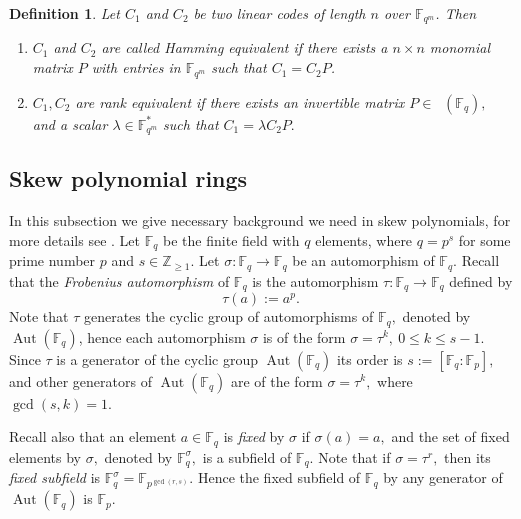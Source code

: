 \documentclass[12pt,paper]{article}
\theoremstyle{plain}
\newtheorem{definition}[theorem]{Definition}
\newcommand{\Fq}{\mathbb{F}_{q}}
\DeclareMathOperator{\aut}{Aut}
\DeclareMathOperator{\GL}{GL_{n}}
\begin{document}
\begin{definition} Let $C_1$ and $C_2$ be two linear codes of length $n$ over $\mathbb{F}_{q^m}$. Then 
\begin{enumerate}
    \item   $C_1$ and $C_2$ are called \emph{Hamming equivalent} if there exists a $n \times n$ monomial matrix $P$ with entries in $ \mathbb{F}_{q^m}$ such that $C_1=C_2 P$.
    \item  $C_1, C_2 $ are \emph{rank equivalent}  if there exists an invertible  matrix $P\in \GL(\mathbb{F}_{q}),$ and a scalar $\lambda \in \mathbb{F}_{q^m}^* $ such that $C_1= \lambda C_2 P.$
\end{enumerate}
\end{definition} 

\subsection{Skew polynomial rings}
In this subsection we give necessary background we need in skew polynomials, for more details see \cite{Ore33,Lam1988,Lam2004-I,Leroy2004,Leroy2008}. Let $\Fq$ be the finite field with $q$ elements, where $q=p^{s}$ for some prime number $p$ and $s \in \mathbb{Z}_{\geq 1}$.  Let $\sigma : \Fq \rightarrow \Fq$ be an automorphism of $\Fq$. Recall that the  \emph{Frobenius  automorphism} of  $\Fq$   is the automorphism $ \tau : \Fq \rightarrow \Fq$ defined by $$\tau(a):=a^{p}.$$ 
 Note that $\tau $ generates the cyclic group of automorphisms of $  \Fq,$ denoted by $\aut(\Fq)$, hence each automorphism $\sigma$ is of the form $ \sigma=\tau^k, \ 0\leq k\leq  s-1.$   Since $\tau $ is a generator of the cyclic group $ \aut(\Fq)$ its order is $s:=[\Fq:\mathbb{F}_p],$ and other generators of $\aut(\Fq)$ are of the form $ \sigma = \tau^{k},$ where $ \gcd(s,k)=1.$  
 
 Recall also that an element $a\in \Fq$ is \emph{fixed} by $\sigma$ if $\sigma(a)=a,$ and the set of fixed elements by $\sigma,$ denoted by $\Fq^{\sigma},$ is a subfield of $\Fq.$   Note that if  $\sigma=\tau^r,$  then its \emph{fixed subfield} is  $\Fq^{\sigma}= \mathbb{F}_{p^{\gcd(r,s)}}.$ Hence the fixed subfield of $\Fq$ by any generator of  $\aut(\Fq)$ is $\mathbb{F}_p.$ 
\end{document}
